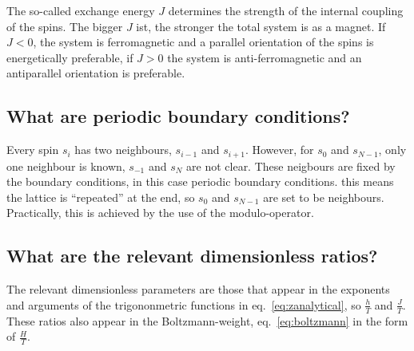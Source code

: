 \documentclass{scrartcl}
\begin{document}
The so-called exchange energy $J$ determines the strength of the internal coupling of the spins. The bigger $J$ ist, the stronger the total system is as a magnet. If $J<0$, the system is ferromagnetic and a parallel orientation of the spins is energetically preferable, if $J>0$ the system is anti-ferromagnetic and an antiparallel orientation is preferable.

\subsection{What are periodic boundary conditions?}
Every spin $s_i$ has two neighbours, $s_{i-1}$ and $s_{i+1}$. However, for $s_0$ and $s_{N-1}$, only one neighbour is known, $s_{-1}$ and $s_N$ are not clear. These neigbours are fixed by the boundary conditions, in this case periodic boundary conditions. this means the lattice is \enquote{repeated} at the end, so $s_0$ and $s_{N-1}$ are set to be neighbours. Practically, this is achieved by the use of the modulo-operator.

\subsection{What are the relevant dimensionless ratios?}

The relevant dimensionless parameters are those that appear in the exponents and arguments of the trigononmetric functions in eq.~\ref{eq:zanalytical}, so $\frac{h}{T}$ and $\frac{J}{T}$. These ratios also appear in the Boltzmann-weight, eq.~\ref{eq:boltzmann} in the form of $\frac{H}{T}$.
\end{document}
